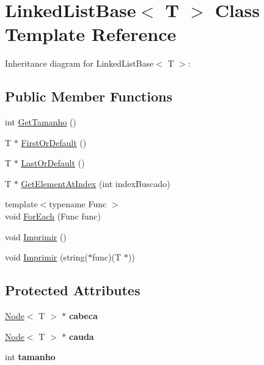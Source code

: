 \hypertarget{class_linked_list_base}{}\section{Linked\+List\+Base$<$ T $>$ Class Template Reference}
\label{class_linked_list_base}


Inheritance diagram for Linked\+List\+Base$<$ T $>$\+:
\subsection*{Public Member Functions}
\begin{DoxyCompactItemize}
\item 
int \hyperlink{class_linked_list_base_a7f4aee5b7dd3ed708ea4ec21a49c25e5}{Get\+Tamanho} ()
\item 
T $\ast$ \hyperlink{class_linked_list_base_ac96f2f82d6da57f6d279875bb14f5abe}{First\+Or\+Default} ()
\item 
T $\ast$ \hyperlink{class_linked_list_base_a494247e0b43636a3014dd0ca59cd222b}{Last\+Or\+Default} ()
\item 
T $\ast$ \hyperlink{class_linked_list_base_a45aabae4256ca1735c4cd804d1afe7d3}{Get\+Element\+At\+Index} (int index\+Buscado)
\item 
{\footnotesize template$<$typename Func $>$ }\\void \hyperlink{class_linked_list_base_a727ba3a0b69d1f14b602a9e987841daa}{For\+Each} (Func func)
\item 
void \hyperlink{class_linked_list_base_a734e3d7271d3d31b02961940a2809d1f}{Imprimir} ()
\item 
void \hyperlink{class_linked_list_base_af631161eb453d9076b6ac5ecd58dce7a}{Imprimir} (string($\ast$func)(T $\ast$))
\end{DoxyCompactItemize}
\subsection*{Protected Attributes}
\begin{DoxyCompactItemize}
\item 
\hyperlink{class_node}{Node}$<$ T $>$ $\ast$ {\bfseries cabeca}\hypertarget{class_linked_list_base_a830dd40ace91854ac6547801098d4b49}{}\label{class_linked_list_base_a830dd40ace91854ac6547801098d4b49}

\item 
\hyperlink{class_node}{Node}$<$ T $>$ $\ast$ {\bfseries cauda}\hypertarget{class_linked_list_base_ae0663c6176274c28622d58fea4d9290a}{}\label{class_linked_list_base_ae0663c6176274c28622d58fea4d9290a}

\item 
int {\bfseries tamanho}\hypertarget{class_linked_list_base_a336a89c1dd243e36e6ba7c040b750caf}{}\label{class_linked_list_base_a336a89c1dd243e36e6ba7c040b750caf}

\end{DoxyCompactItemize}


